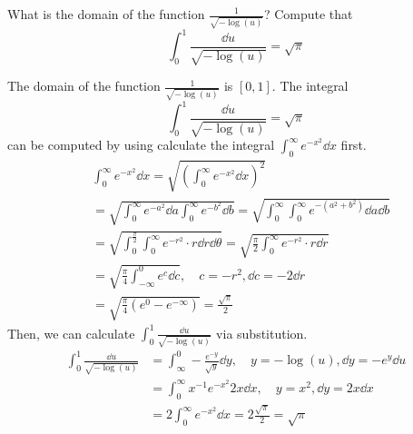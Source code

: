 \documentclass[8pt,twocolumn]{article}
\begin{document}
\begin{exercise}{16}
  What is the domain of the function $\frac{1}{\sqrt{-\log(u)}}$? Compute that
  \[
    \int_0^1 \frac{\dd{u}}{\sqrt{-\log(u)}} = \sqrt{\pi}
  \]
\end{exercise}

\begin{answer}{16}
  The domain of the function $\frac{1}{\sqrt{-\log(u)}}$ is $[0,1]$. The
  integral
  \[
    \int_0^1 \frac{\dd{u}}{\sqrt{-\log(u)}} = \sqrt{\pi}
  \]
  can be computed by using calculate the integral $\int_0^\infty
  e^{-x^2}\dd{x}$ first.
  \begin{align*}
    &\int_0^\infty e^{-x^2}\dd{x} = \sqrt{(\int_0^\infty e^{-x^2}\dd{x})^2} \\
    &= \sqrt{\int_0^\infty e^{-a^2}\dd{a}\int_0^\infty e^{-b^2}\dd{b}}
    = \sqrt{\int_0^\infty\int_0^\infty e^{-(a^2+b^2)}\dd{a}\dd{b}} \\
    &= \sqrt{\int_0^\frac{\pi}{2}\int_0^\infty e^{-r^2} \cdot r
    \dd{r}\dd{\theta}}
    = \sqrt{\frac{\pi}{2}\int_0^\infty e^{-r^2} \cdot r \dd{r}} \\
    &= \sqrt{\frac{\pi}{4}\int_{-\infty}^{0} e^c \dd{c}},\quad c =
    -r^2, \dd{c} = -2\dd{r}  \\
    &= \sqrt{\frac{\pi}{4}(e^0-e^{-\infty})} = \frac{\sqrt{\pi}}{2}
  \end{align*}
  Then, we can calculate $\int_0^1 \frac{\dd{u}}{\sqrt{-\log(u)}}$ via
  substitution.
  \begin{align*}
    \int_0^1 \frac{\dd{u}}{\sqrt{-\log(u)}} &= \int_\infty^0
    -\frac{e^{-y}}{\sqrt{y}} \dd{y},\quad y=-\log(u), \dd{y} = -e^y\dd{u} \\
    &= \int_0^\infty x^{-1} e^{-x^2} 2x \dd{x},\quad y=x^2,
    \dd{y}=2x\dd{x} \\
    &= 2\int_0^\infty e^{-x^2} \dd{x} = 2\frac{\sqrt{\pi}}{2} = \sqrt{\pi}
  \end{align*}
\end{answer}
\end{document}
